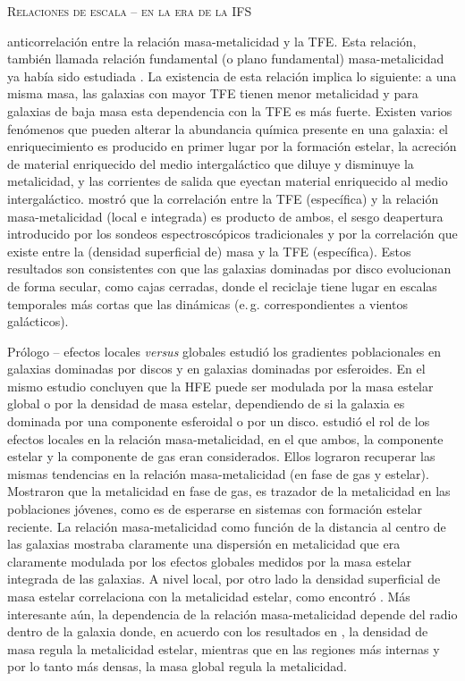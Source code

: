 \documentclass[xcolor=dvipsnames,4pt,hyperref={colorlinks,citecolor=black,linkcolor=black,urlcolor=black}]{beamer}
\begin{document}
\begin{frame}[allowframebreaks]{\textsc{Relaciones de escala -- en la era de la IFS}}
\begin{description}
anticorrelación entre la relación masa-metalicidad y la TFE. Esta relación, también llamada relación
fundamental (o plano fundamental) masa-metalicidad ya había sido estudiada \citep{Lara-Lopez2010}.
La existencia de esta relación implica lo siguiente: a una misma masa, las galaxias con mayor TFE
tienen menor metalicidad y para galaxias de baja masa esta dependencia con la TFE es más fuerte.
Existen varios fenómenos que pueden alterar la abundancia química presente en una galaxia: el
enriquecimiento es producido en primer lugar por la formación estelar, la acreción de material
enriquecido del medio intergaláctico que diluye y disminuye la metalicidad, y las corrientes de
salida que eyectan material enriquecido al medio intergaláctico. \citet{Sanchez2013} mostró que la
correlación entre la TFE (específica) y la relación masa-metalicidad (local e integrada) es producto
de ambos, el sesgo deapertura introducido por los sondeos espectroscópicos tradicionales y por la
correlación que existe entre la (densidad superficial de) masa y la TFE (específica). Estos
resultados son consistentes con que las galaxias dominadas por disco evolucionan de forma secular,
como cajas cerradas, donde el reciclaje tiene lugar en escalas temporales más cortas que las
dinámicas (e.\,g. correspondientes a vientos galácticos).
%
\end{description}

\end{frame}

\begin{frame}[allowframebreaks]{Prólogo -- efectos locales \emph{versus} globales}
%
\citet{Gonzalez2014a} estudió los gradientes poblacionales en galaxias dominadas por discos y en
galaxias dominadas por esferoides. En el mismo estudio concluyen que la HFE puede ser modulada por
la masa estelar global o por la densidad de masa estelar, dependiendo de si la galaxia es dominada
por una componente esferoidal o por un disco. \citet{Gonzalez2014b} estudió el rol de los efectos
locales en la relación masa-metalicidad, en el que ambos, la componente estelar y la componente de
gas eran considerados. Ellos lograron recuperar las mismas tendencias en la relación
masa-metalicidad (en fase de gas y estelar). Mostraron que la metalicidad en fase de gas, es
trazador de la metalicidad en las poblaciones jóvenes, como es de esperarse en sistemas con
formación estelar reciente. La relación masa-metalicidad como función de la distancia al centro de
las galaxias mostraba claramente una dispersión en metalicidad que era claramente modulada por los
efectos globales medidos por la masa estelar integrada de las galaxias. A nivel local, por otro lado
la densidad superficial de masa estelar correlaciona con la metalicidad estelar, como encontró
\citet{Sanchez2013}. Más interesante aún, la dependencia de la relación masa-metalicidad depende del
radio dentro de la galaxia donde, en acuerdo con los resultados en \citet{Gonzalez2014a}, la
densidad de masa regula la metalicidad estelar, mientras que en las regiones más internas y por lo
tanto más densas, la masa global regula la metalicidad.
%
\end{frame}
\end{document}
